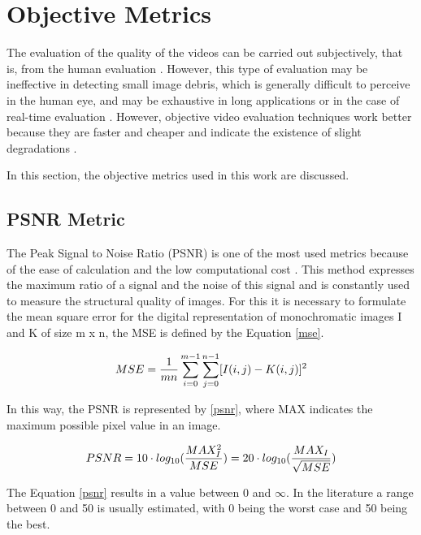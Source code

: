 \documentclass[journal]{IEEEtran}
\begin{document}
\section{Objective Metrics}

The evaluation of the quality of the videos can be carried out subjectively, that is, from the human evaluation \cite{itu:99}. However, this type of evaluation may be ineffective in detecting small image debris, which is generally difficult to perceive in the human eye, and may be exhaustive in long applications or in the case of real-time evaluation \cite{estrada:09}\cite{regis:12}. However, objective video evaluation techniques work better because they are faster and cheaper and indicate the existence of slight degradations \cite{regis:12}.

In this section, the objective metrics used in this work are discussed.

\subsection{PSNR Metric}

The Peak Signal to Noise Ratio (PSNR) is one of the most used metrics because of the ease of calculation and the low computational cost \cite{danilo:15}. This method expresses the maximum ratio of a signal and the noise of this signal and is constantly used to measure the structural quality of images. For this it is necessary to formulate the mean square error for the digital representation of monochromatic images I and K of size m x n, the MSE is defined by the Equation \ref{mse}.

\begin{equation}
	\centering
	\label{mse}
	MSE=\frac{1}{mn}\sum_{i=0}^{m-1}\sum_{j=0}^{n-1}[I(i,j)-K(i,j)]^{2}
\end{equation}

In this way, the PSNR is represented by \ref{psnr}, where MAX indicates the maximum possible pixel value in an image.

\begin{equation}
	\centering
	\label{psnr}
	PSNR = 10 \cdot log_{10}(\frac{MAX^{2}_{I}}{MSE}) = 20 \cdot log_{10}(\frac{MAX_{I}}{\sqrt{MSE}})
\end{equation}


The Equation \ref{psnr} results in a value between 0 and $\infty$. In the literature a range between 0 and 50 is usually estimated, with 0 being the worst case and 50 being the best.
\end{document}

